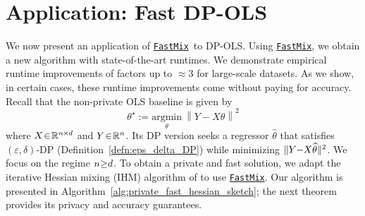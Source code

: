 \documentclass[11pt]{article}
\theoremstyle{definition}
\theoremstyle{plain}
\providecommand{\definitionref}[1]
{Definition~\ref{#1}}
\providecommand{\algorithmref}[1]{Algorithm~\ref{#1}}
\newcommand{\reals}{\mathbb{R}}
\newcommand{\eps}{{\varepsilon}}
\newcommand{\Norm}[1]{\left\| #1 \right\|}
\providecommand{\norm}[1]{\Norm{#1}}
\newcommand{\argmin}{\mathrm{argmin}}
\renewcommand{\eps}{\varepsilon}
\newcommand{\FastMix}{\hyperref[alg:fast_mixing]{\texttt{FastMix}}\xspace}
\begin{document}
\section{Application: Fast DP-OLS}
\label{s:apps}
We now present an application of \FastMix\ to DP-OLS. Using \FastMix, we obtain a new algorithm with state-of-the-art runtimes. We demonstrate empirical runtime improvements of factors up to $\approx 3$ for large-scale datasets. As we show, in certain cases, these runtime improvements come without paying for accuracy. Recall that the non-private OLS baseline is given by
{
\setlength{\abovedisplayskip}{3pt}
\setlength{\belowdisplayskip}{3pt}
\setlength{\abovedisplayshortskip}{2pt}
\setlength{\belowdisplayshortskip}{2pt}
\begin{equation*}
    \theta^{\star} := \underset{\theta}{\argmin} \ \norm{Y - X\theta}^2
\end{equation*}
}
where $X\hspace{-0.2em}\in\hspace{-0.2em} \reals^{n\hspace{-0.05em}\times\hspace{-0.05em} d}$ and $Y\hspace{-0.2em}\in\hspace{-0.2em} \reals^{n}$. Its DP version seeks a regressor $\widehat{\theta}$ that satisfies $(\eps,\delta)$-DP (\definitionref{defn:eps_delta_DP}) while minimizing $\|Y \hspace{-0.25em}-\hspace{-0.25em} X\widehat{\theta}\|^2$. We focus on the regime $n\hspace{-0.25em}\geq\hspace{-0.25em} d$. To obtain a private and fast solution, we adapt the iterative Hessian mixing (IHM) algorithm of \citep{lev2026near} to use \FastMix. Our algorithm is presented in \algorithmref{alg:private_fast_hessian_sketch}; the next theorem provides its privacy and accuracy guarantees.
\end{document}
